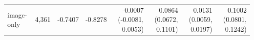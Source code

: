 \begin{tabular}{lrrrrrrr}
image-only & 4,361 & -0.7407 & -0.8278 & -0.0007 (-0.0081, 0.0053) & 0.0864 (0.0672, 0.1101) & 0.0131 (0.0059, 0.0197) & 0.1002 (0.0801, 0.1242) \\

\end{tabular}
